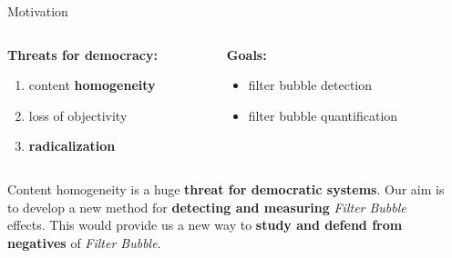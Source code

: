\documentclass{beamer}
\begin{document}
\begin{frame}[fragile]
\begin{columns}[T]
\begin{column}{.33\textwidth}
\end{column}
\begin{column}{.63\textwidth}
\begin{customalertblock}{Motivation}
    \begin{columns}
        \begin{column}{.5\textwidth}
            \begin{large}\textbf{Threats for democracy:}\end{large}
            \vspace{0.5cm}
            \begin{enumerate}
                \item content \textbf{homogeneity}
                \item loss of objectivity
                \item \textbf{radicalization}
            \end{enumerate}
        \end{column}
        \begin{column}{.5\textwidth}
            \begin{large}\textbf{Goals:}\end{large}
            \vspace{0.5cm}
            \begin{itemize}
                \item filter bubble detection
                \item filter bubble quantification
            \end{itemize}
        \end{column}
    \end{columns}
    \vspace{1cm}
    Content homogeneity is a huge \textbf{threat for democratic systems}. Our aim is to develop a new method for \textbf{detecting and measuring} \textit{Filter Bubble} effects. This would provide us a new way to \textbf{study and defend from negatives} of \textit{Filter Bubble}.

\end{customalertblock}
\end{column}
\end{columns}
\end{frame}
\end{document}
